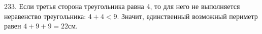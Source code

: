233. Если третья сторона треугольника равна 4, то для него не выполняется неравенство треугольника: $4+4<9.$ Значит, единственный возможный периметр равен $4+9+9=22$см.\\
